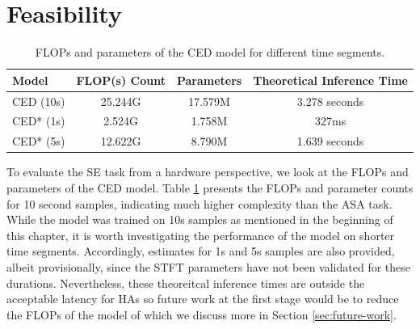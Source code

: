 \documentclass[logo,bsc,singlespacing,parskip,online]{infthesis}
\begin{document}
\section{Feasibility}
\begin{table}[h]
   \centering
   \begin{tabular}{lccc}
      \toprule
      Model & FLOP(s) Count & Parameters & Theoretical Inference Time\footnotemark \\
      \midrule
      CED (10s) & 25.244G & 17.579M & 3.278 seconds \\ %
      CED* (1s) & 2.524G & 1.758M & 327ms \\ %
      CED* (5s) & 12.622G & 8.790M & 1.639 seconds \\ %
      \bottomrule
   \end{tabular}
   \caption{FLOPs and parameters of the CED model for different time segments.}
   \label{tab:ced-model-metrics}
\end{table}
To evaluate the SE task from a hardware perspective, we look at the FLOPs and parameters of the CED model.
Table \ref{tab:ced-model-metrics} presents the FLOPs and parameter counts for 10 second samples, 
indicating much higher complexity than the ASA task. While the model was trained on 10s samples 
as mentioned in the beginning of this chapter, it is worth investigating the performance of the model 
on shorter time segments. Accordingly, estimates for 1s and 5s samples are also provided, albeit 
provisionally, since the STFT parameters have not been validated for these durations. Nevertheless,
these theoreitcal inference times are outside the acceptable latency for HAs so future work at 
the first stage would be to reduce the FLOPs of the model of which we discuss more in Section \ref{sec:future-work}.

\end{document}
